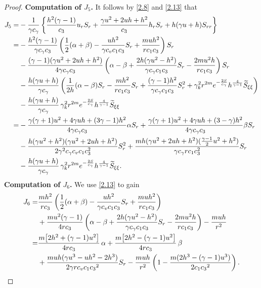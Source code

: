 \documentclass[10pt,a4paper]{amsart}
\begin{document}
\begin{proof}
\noindent\textbf{Computation of $J_5$.}
It follows by \eqref{2.8} and \eqref{2.13} that
 \begin{align}
J_5
= &-\frac{1}{\gamma c_\gamma}\left\{\frac{h^2(\gamma-1)}{c_3}u_rS_r+\frac{\gamma u^2+2uh+h^2}{c_3}h_rS_r+h(\gamma u+h)S_{rr}\right\}\notag\\
=& -\frac{h^2(\gamma-1)}{\gamma c_\gamma c_3}\left(\frac12(\alpha+\beta)-\frac{uh^2}{\gamma c_v c_1c_3}S_r+\frac{muh^2}{rc_1c_3}\right)S_r \notag\\
& -\frac{(\gamma-1)(\gamma u^2+2uh+h^2)}{4\gamma c_\gamma c_3}\left(\alpha-\beta+\frac{2h(\gamma u^2-h^2)}{\gamma c_\gamma c_1c_3}S_r-\frac{2mu^2h}{rc_1c_3}\right)S_r \notag\\
& -\frac{h(\gamma u+h)}{\gamma c_\gamma}\left(\frac{1}{2h}(\alpha-\beta)S_r-\frac{mh^2}{rc_1c_3}S_r+\frac{(\gamma-1)h^2}{\gamma c_\gamma c_1c_3}S_r^2+\gamma_k^2r^{2m}e^{-\frac{2S}{c_\gamma}}h^{\frac{4}{\gamma-1}} \widetilde{S}_{\xi\xi}\right)\notag\\
& -\frac{h(\gamma u+h)}{\gamma c_\gamma}\,\gamma_k^2 r^{2m}e^{-\frac{2S}{c_\gamma}}h^{\frac{4}{\gamma-1}}\widetilde{S}_{\xi\xi}\notag\\
=&- \frac{\gamma(\gamma+1)u^2+4\gamma uh + (3\gamma-1)h^2}{4\gamma c_\gamma c_3}\alpha S_r
+ \frac{\gamma(\gamma+1)u^2+4\gamma uh + (3-\gamma)h^2}{4\gamma c_\gamma c_3} \beta S_r\notag\\
&  -\frac{h(\gamma u^2 + h^2)(\gamma u^2+2uh+h^2)}{2\gamma^2 c_\gamma c_v c_1c_3^2} S_r^2
+\frac{mh(\gamma u^2+2uh+h^2)(\frac{\gamma-1}{2}u^2+h^2)}{\gamma c_\gamma rc_1c_3^2} S_r\notag\\
& -\frac{h(\gamma u+h)}{\gamma c_\gamma}\,\gamma_k^2 r^{2m}e^{-\frac{2S}{c_\gamma}}h^{\frac{4}{\gamma-1}}\widetilde{S}_{\xi\xi}. \notag
 \end{align}
\noindent\textbf{Computation of $J_6$.}
We use \eqref{2.13} to gain
 \begin{align}
J_6
=& \frac{m h^2}{rc_3}\left( \frac12(\alpha+\beta) - \frac{uh^2}{\gamma c_v c_1 c_3}S_r + \frac{m u h^2}{rc_1 c_3} \right) \nonumber\\
  & +\frac{m u^2(\gamma-1)}{4rc_3}\left( \alpha-\beta + \frac{2h(\gamma u^2-h^2)}{\gamma c_\gamma c_1 c_3}S_r - \frac{2m u^2 h}{rc_1 c_3} \right) -\frac{m u h}{r^2}\nonumber\\
=& \frac{m\big[2h^2 + (\gamma-1)u^2\big]}{4r c_3} \,\alpha + \frac{m\big[2h^2 - (\gamma-1)u^2\big]}{4r c_3} \,\beta \nonumber\\
  &  + \frac{muh(\gamma u^3-uh^2-2h^3)}{2\gamma r c_vc_1 {c_3}^2}  S_r - \frac{m u h}{r^2}\left( 1 - \frac{m(2h^3 - (\gamma-1)u^3)}{2 c_1 {c_3}^2} \right). \notag
 \end{align}


\end{proof}
\end{document}
